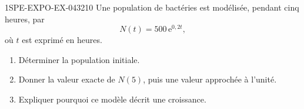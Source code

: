 \begin{exercice}{1SPE-EXPO-EX-043}{2}{10}
Une population de bactéries est modélisée, pendant cinq heures, par
\[N(t)=500\,\mathrm{e}^{0{,}2t},\]
où $t$ est exprimé en heures.

\begin{enumerate}
\item Déterminer la population initiale.
\item Donner la valeur exacte de $N(5)$, puis une valeur approchée à l'unité.
\item Expliquer pourquoi ce modèle décrit une croissance.
\end{enumerate}
\end{exercice}
